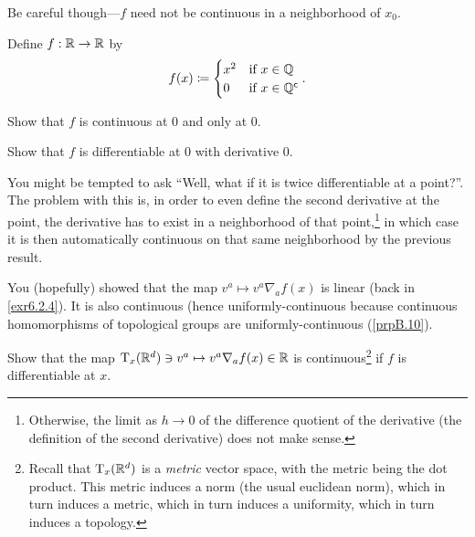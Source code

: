 Be careful though---$f$ need not be continuous in a neighborhood of $x_0$.
\begin{exm}
Define $f:\mathbb{R} \rightarrow \mathbb{R}$ by
\begin{equation}
f(x)\coloneqq \begin{cases}x^2 & \text{if }x\in \mathbb{Q} \\ 0 & \text{if }x\in \mathbb{Q} ^{\mathsf{c}}\end{cases}.
\end{equation}
\begin{exr}
Show that $f$ is continuous at $0$ and only at $0$.
\end{exr}
\begin{exr}
Show that $f$ is differentiable at $0$ with derivative $0$.
\end{exr}
\begin{rmk}
You might be tempted to ask ``Well, what if it is twice differentiable at a point?''.  The problem with this is, in order to even define the second derivative at the point, the derivative has to exist in a neighborhood of that point,\footnote{Otherwise, the limit as $h\to 0$ of the difference quotient of the derivative (the definition of the second derivative) does not make sense.} in which case it is then automatically continuous on that same neighborhood by the previous result.
\end{rmk}
\end{exm}

You (hopefully) showed that the map $v^a\mapsto v^a\nabla _af(x)$ is linear (back in \cref{exr6.2.4}).  It is also continuous (hence uniformly-continuous because continuous homomorphisms of topological groups are uniformly-continuous (\cref{prpB.10}).
\begin{exr}
Show that the map $\tangent[\R ^d][x]\ni v^a\mapsto v^a\nabla _af(x)\in \R$ is continuous\footnote{Recall that $\tangent[\R ^d][x]$ is a \emph{metric} vector space, with the metric being the dot product.  This metric induces a norm (the usual euclidean norm), which in turn induces a metric, which in turn induces a uniformity, which in turn induces a topology.} if $f$ is differentiable at $x$.
\end{exr}


